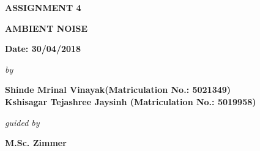 \begin{center}
\vspace{-2.2cm}
\vspace{2.5cm}
\bfseries{ASSIGNMENT 4}\\
\vspace{0.5cm}
\begin{large}
{\bfseries AMBIENT NOISE }\\
\end{large}
\vspace{0.5cm}
{\bfseries Date: 30/04/2018 }\\
\vspace{0.4cm}
\begin{small}
\emph{by}\\
\end{small}
\vspace{0.4cm}
\bfseries{Shinde Mrinal Vinayak(Matriculation No.: 5021349)\\Kshisagar Tejashree Jaysinh (Matriculation No.: 5019958)}\\
\vspace{0.3cm}
\begin{small}
\emph{guided by}\\
\end{small}
\vspace{0.3cm}
{\bfseries \large M.Sc. Zimmer}\\
\vspace{0.1cm}
\end{center}
